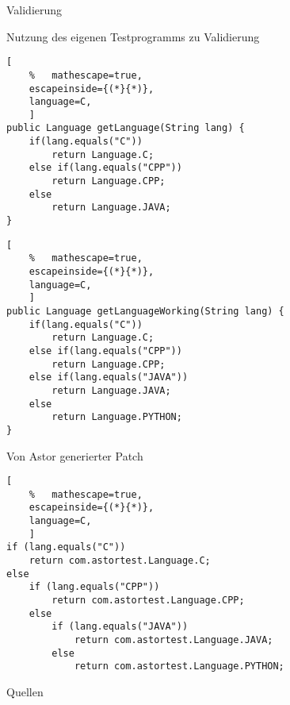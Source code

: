 %
\begin{frame}{Validierung}
\begin{itemizes}{1em}
	\item Nutzung des eigenen Testprogramms zu Validierung
\end{itemizes}
\end{frame}
%
\begin{frame}[fragile=singleslide]{}
\begin{minipage}{27em}
	\begin{lstlisting}[
	%	mathescape=true,
	escapeinside={(*}{*)}, 
	language=C,
	]
public Language getLanguage(String lang) {
	if(lang.equals("C"))
		return Language.C;
	else if(lang.equals("CPP"))
		return Language.CPP;
	else
		return Language.JAVA;
}
	\end{lstlisting}
\end{minipage}
\begin{minipage}{27em}
	\begin{lstlisting}[
	%	mathescape=true,
	escapeinside={(*}{*)}, 
	language=C,
	]
public Language getLanguageWorking(String lang) {
	if(lang.equals("C"))
		return Language.C;
	else if(lang.equals("CPP"))
		return Language.CPP;
	else if(lang.equals("JAVA"))
		return Language.JAVA;
	else
		return Language.PYTHON;
}
	\end{lstlisting}
\end{minipage}
\end{frame}
%
\begin{frame}[fragile=singleslide]{Von Astor generierter Patch}
	\begin{lstlisting}[
	%	mathescape=true,
	escapeinside={(*}{*)}, 
	language=C,
	]
if (lang.equals("C"))
	return com.astortest.Language.C;
else
	if (lang.equals("CPP"))
		return com.astortest.Language.CPP;
	else
		if (lang.equals("JAVA"))
			return com.astortest.Language.JAVA;
		else
			return com.astortest.Language.PYTHON;	
	\end{lstlisting}
\end{frame}
%
\begin{frame}{Quellen}
	
	\nocite{*}
	
\end{frame}
%